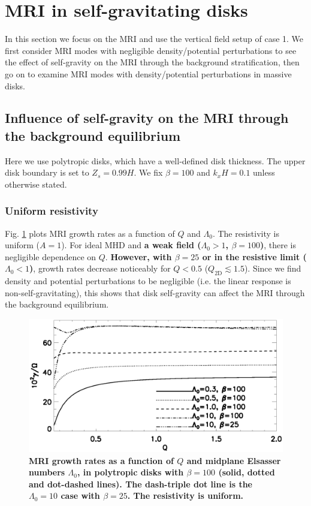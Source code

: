 \section{MRI in self-gravitating disks}\label{result1}
In this section we focus on the MRI and use the vertical field setup
of case 1. We first consider MRI modes with negligible density/potential
perturbations to see the effect of self-gravity on the MRI through the
background stratification, then go on to examine MRI modes with
density/potential perturbations in massive disks.  

\subsection{Influence of self-gravity on the MRI through the
  background equilibrium}
Here we use polytropic disks, which have a well-defined disk
thickness. The upper disk boundary is set to $Z_s=0.99H$. We fix
$\beta=100$ and $k_xH=0.1$ unless otherwise stated. 

\subsubsection{Uniform
  resistivity}   
Fig. \ref{compare_growth_poly_uniresis} plots MRI growth rates as a
function of $Q$ and $\Lambda_0$. The resistivity is uniform ($A=1$). 
For ideal MHD and {\bf a weak field ($\Lambda_0>1$, $\beta=100$)}, there is
negligible dependence on $Q$. {\bf However, with $\beta=25$ or 
in the resistive limit  ($\Lambda_0<1$)}, growth rates decrease noticeably for $Q<0.5$
($Q_\mathrm{2D}\lesssim 1.5$).  Since we find density and potential
perturbations to be negligible (i.e. the linear response is
non-self-gravitating), this shows that disk self-gravity can affect the
MRI through the background equilibrium. 

\begin{figure}
  \includegraphics[width=\linewidth]{figures/compare_growth_poly_uniresis2}
  \caption{{\bf MRI growth rates as a function of $Q$ and midplane 
    Elsasser numbers $\Lambda_0$, in polytropic disks with $\beta=100$
    (solid, dotted and dot-dashed lines). The dash-triple dot line is
    the $\Lambda_0=10$ case with $\beta=25$. The resistivity is
    uniform.}   
    \label{compare_growth_poly_uniresis}}
\end{figure}

